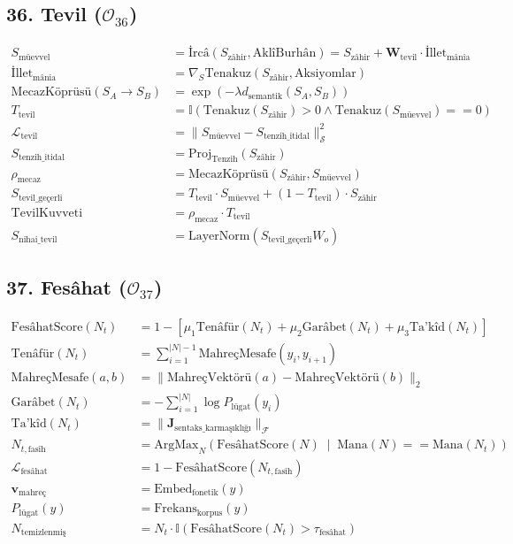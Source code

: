 \documentclass[11pt, a4paper]{article}
\begin{document}
\subsection{36. Tevil ($\mathcal{O}_{36}$)}
\begin{align}
S_{\text{müevvel}} &= \text{İrcâ}(S_{\text{zâhir}}, \text{AklîBurhân}) = S_{\text{zâhir}} + \mathbf{W}_{\text{tevil}} \cdot \text{İllet}_{\text{mânia}} \\
\text{İllet}_{\text{mânia}} &= \nabla_S \text{Tenakuz}(S_{\text{zâhir}}, \text{Aksiyomlar}) \\
\text{MecazKöprüsü}(S_A \to S_B) &= \exp\left( -\lambda d_{\text{semantik}}(S_A, S_B) \right) \\
T_{\text{tevil}} &= \mathbb{I}\left( \text{Tenakuz}(S_{\text{zâhir}}) > 0 \land \text{Tenakuz}(S_{\text{müevvel}}) == 0 \right) \\
\mathcal{L}_{\text{tevil}} &= \| S_{\text{müevvel}} - S_{\text{tenzih\_itidal}} \|_{\mathcal{S}}^2 \\
S_{\text{tenzih\_itidal}} &= \text{Proj}_{\text{Tenzih}}(S_{\text{zâhir}}) \\
\rho_{\text{mecaz}} &= \text{MecazKöprüsü}(S_{\text{zâhir}}, S_{\text{müevvel}}) \\
S_{\text{tevil\_geçerli}} &= T_{\text{tevil}} \cdot S_{\text{müevvel}} + (1 - T_{\text{tevil}}) \cdot S_{\text{zâhir}} \\
\text{TevilKuvveti} &= \rho_{\text{mecaz}} \cdot T_{\text{tevil}} \\
S_{\text{nihai\_tevil}} &= \text{LayerNorm}(S_{\text{tevil\_geçerli}} W_o)
\end{align}

\subsection{37. Fesâhat ($\mathcal{O}_{37}$)}
\begin{align}
\text{FesâhatScore}(N_t) &= 1 - \left[ \mu_1 \text{Tenâfür}(N_t) + \mu_2 \text{Garâbet}(N_t) + \mu_3 \text{Ta'kîd}(N_t) \right] \\
\text{Tenâfür}(N_t) &= \sum_{i=1}^{|N|-1} \text{MahreçMesafe}(y_i, y_{i+1}) \\
\text{MahreçMesafe}(a, b) &= \| \text{MahreçVektörü}(a) - \text{MahreçVektörü}(b) \|_2 \\
\text{Garâbet}(N_t) &= -\sum_{i=1}^{|N|} \log P_{\text{lügat}}(y_i) \\
\text{Ta'kîd}(N_t) &= \| \mathbf{J}_{\text{sentaks\_karmaşıklığı}} \|_{\mathcal{F}} \\
N_{t, \text{fasîh}} &= \text{ArgMax}_{N} \left( \text{FesâhatScore}(N) \;\middle|\; \text{Mana}(N) == \text{Mana}(N_t) \right) \\
\mathcal{L}_{\text{fesâhat}} &= 1 - \text{FesâhatScore}(N_{t, \text{fasîh}}) \\
\mathbf{v}_{\text{mahreç}} &= \text{Embed}_{\text{fonetik}}(y) \\
P_{\text{lügat}}(y) &= \text{Frekans}_{\text{korpus}}(y) \\
N_{\text{temizlenmiş}} &= N_t \cdot \mathbb{I}(\text{FesâhatScore}(N_t) > \tau_{\text{fesâhat}})
\end{align}
\end{document}
